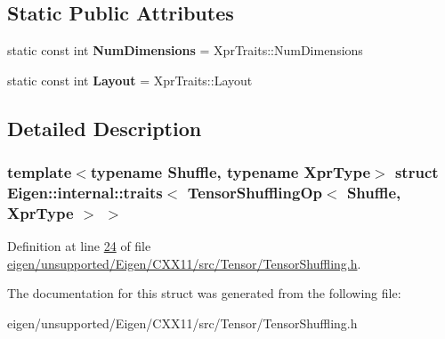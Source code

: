 \subsection*{Static Public Attributes}
\begin{DoxyCompactItemize}
\item 
\mbox{\label{struct_eigen_1_1internal_1_1traits_3_01_tensor_shuffling_op_3_01_shuffle_00_01_xpr_type_01_4_01_4_ad9d4290b3bc2693bddc0d2ae8c3952fb}} 
static const int {\bfseries Num\+Dimensions} = Xpr\+Traits\+::\+Num\+Dimensions
\item 
\mbox{\label{struct_eigen_1_1internal_1_1traits_3_01_tensor_shuffling_op_3_01_shuffle_00_01_xpr_type_01_4_01_4_acf457a81af9adcd521d0976f668923a3}} 
static const int {\bfseries Layout} = Xpr\+Traits\+::\+Layout
\end{DoxyCompactItemize}


\subsection{Detailed Description}
\subsubsection*{template$<$typename Shuffle, typename Xpr\+Type$>$\newline
struct Eigen\+::internal\+::traits$<$ Tensor\+Shuffling\+Op$<$ Shuffle, Xpr\+Type $>$ $>$}



Definition at line \hyperlink{eigen_2unsupported_2_eigen_2_c_x_x11_2src_2_tensor_2_tensor_shuffling_8h_source_l00024}{24} of file \hyperlink{eigen_2unsupported_2_eigen_2_c_x_x11_2src_2_tensor_2_tensor_shuffling_8h_source}{eigen/unsupported/\+Eigen/\+C\+X\+X11/src/\+Tensor/\+Tensor\+Shuffling.\+h}.



The documentation for this struct was generated from the following file\+:\begin{DoxyCompactItemize}
\item 
eigen/unsupported/\+Eigen/\+C\+X\+X11/src/\+Tensor/\+Tensor\+Shuffling.\+h\end{DoxyCompactItemize}
